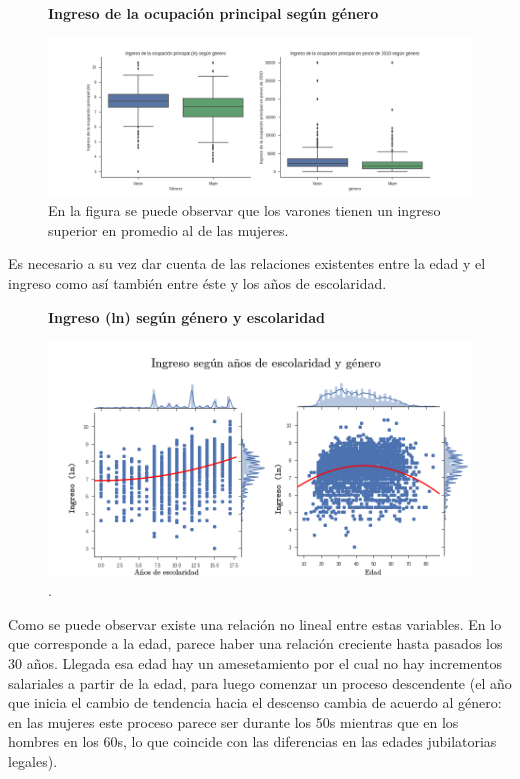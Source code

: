 \begin{figure}[!htb]
	\textbf{Ingreso de la ocupación principal según género}\par\medskip
	\includegraphics[scale = 0.4]{../img/capitulo3/ingresoVgenero.png}
	\caption{En la figura se puede observar que los varones tienen un ingreso superior en promedio al de las mujeres.}
\end{figure}

Es necesario a su vez dar cuenta de las relaciones existentes entre la edad y el ingreso como así también entre éste y los años de escolaridad. 

\begin{figure}[!htb]
	\textbf{Ingreso (ln) según género y escolaridad}\par\medskip
	\includegraphics[scale = 0.4]{../img/capitulo3/ingresoVedadVescolaridad.png}
	\caption{.}
\end{figure}

Como se puede observar existe una relación no lineal entre estas variables. En lo que corresponde a la edad, parece haber una relación creciente hasta pasados los 30 años. Llegada esa edad hay un amesetamiento por el cual no hay incrementos salariales a partir de la edad, para luego comenzar un proceso descendente (el año que inicia el cambio de tendencia hacia el descenso cambia de acuerdo al género: en las mujeres este proceso parece ser durante los 50s mientras que en los hombres en los 60s, lo que coincide con las diferencias en las edades jubilatorias legales).

